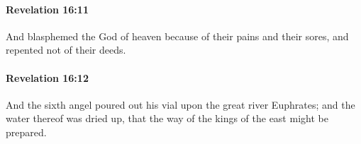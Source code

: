 		\paragraph{Revelation 16:11} %
			\label{REVELATIONNT-16-11}

			And blasphemed the God of heaven because of their pains and their sores, and repented not of their deeds.

			\begin{framed}
			\scriptsize
				\begin{compactdesc}
					\item[SBLG] 
				\end{compactdesc}
			\end{framed}

		\paragraph{Revelation 16:12} %
			\label{REVELATIONNT-16-12}

			And the sixth angel poured out his vial upon the great river Euphrates; and the water thereof was dried up, that the way of the kings of the east might be prepared.

